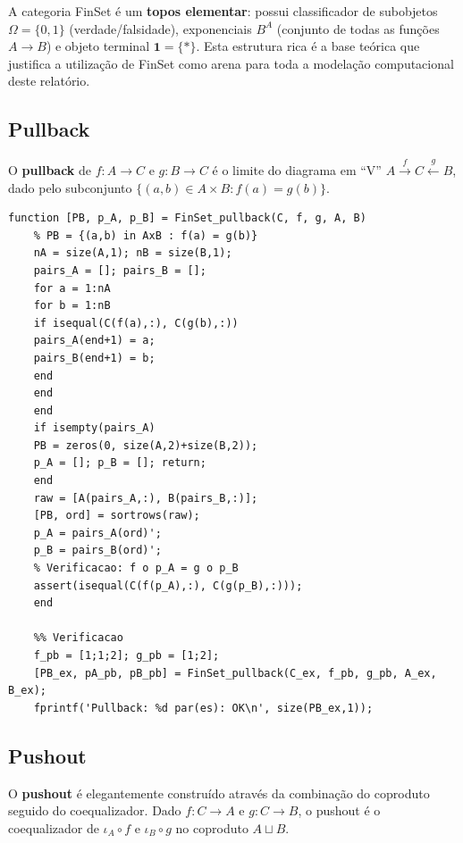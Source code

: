 \begin{proposition}
	A categoria FinSet é um \textbf{topos elementar}: possui
	classificador de subobjetos $\Omega = \{0,1\}$ (verdade/falsidade),
	exponenciais $B^A$ (conjunto de todas as funções $A \to B$) e
	objeto terminal $\mathbf{1} = \{*\}$. Esta estrutura rica é a
	base teórica que justifica a utilização de FinSet como arena
	para toda a modelação computacional deste relatório.
\end{proposition}

\subsection{Pullback}

O \textbf{pullback} de $f: A \to C$ e $g: B \to C$ é o limite
do diagrama em ``V'' $A \xrightarrow{f} C \xleftarrow{g} B$,
dado pelo subconjunto
$\{(a,b) \in A \times B : f(a) = g(b)\}$.

\begin{lstlisting}[style=matlab, caption={Pullback em FinSet}]
	function [PB, p_A, p_B] = FinSet_pullback(C, f, g, A, B)
	% PB = {(a,b) in AxB : f(a) = g(b)}
	nA = size(A,1); nB = size(B,1);
	pairs_A = []; pairs_B = [];
	for a = 1:nA
	for b = 1:nB
	if isequal(C(f(a),:), C(g(b),:))
	pairs_A(end+1) = a;
	pairs_B(end+1) = b;
	end
	end
	end
	if isempty(pairs_A)
	PB = zeros(0, size(A,2)+size(B,2));
	p_A = []; p_B = []; return;
	end
	raw = [A(pairs_A,:), B(pairs_B,:)];
	[PB, ord] = sortrows(raw);
	p_A = pairs_A(ord)';
	p_B = pairs_B(ord)';
	% Verificacao: f o p_A = g o p_B
	assert(isequal(C(f(p_A),:), C(g(p_B),:)));
	end
	
	%% Verificacao
	f_pb = [1;1;2]; g_pb = [1;2];
	[PB_ex, pA_pb, pB_pb] = FinSet_pullback(C_ex, f_pb, g_pb, A_ex, B_ex);
	fprintf('Pullback: %d par(es): OK\n', size(PB_ex,1));
\end{lstlisting}

\subsection{Pushout}

O \textbf{pushout} é elegantemente construído através da
combinação do coproduto seguido do coequalizador. Dado
$f: C \to A$ e $g: C \to B$, o pushout é o coequalizador
de $\iota_A \circ f$ e $\iota_B \circ g$ no coproduto
$A \sqcup B$.

